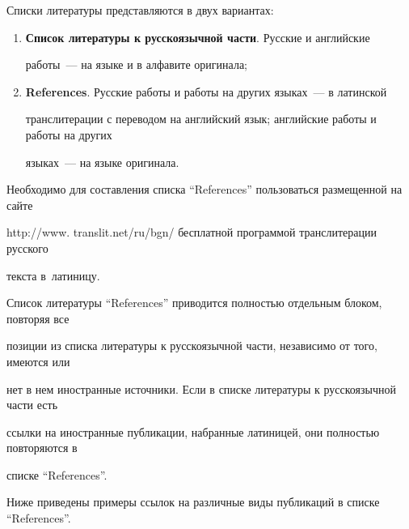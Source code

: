 {\begin{enumerate}[1.]
Списки литературы представляются в двух вариантах:\\[-14pt]





\noindent


\begin{enumerate}[(1)]


\item \textbf{Список литературы к русскоязычной части}. Русские и английские


работы~---  на языке и в алфавите оригинала;\\[-14.5pt]


\item  \textbf{References}. Русские работы и работы на других языках~--- в латинской


транслитерации с переводом на английский язык; английские работы и работы на других


языках~--- на языке оригинала.


\end{enumerate}





Необходимо для составления списка ``References'' пользоваться размещенной на сайте


{\sf http://www. translit.net/ru/bgn/} бесплатной программой транслитерации русского


 текста в~латиницу.





Список литературы ``References'' приводится полностью отдельным блоком, повторяя все


позиции из списка литературы к русскоязычной части, независимо от того, имеются или


нет в нем иностранные источники. Если в списке литературы к русскоязычной части есть


ссылки на иностранные публикации, набранные латиницей, они полностью повторяются в


списке ``References''.





Ниже приведены примеры ссылок на различные виды публикаций в списке ``References''.





\def\leftfootline{\ } %





\end{enumerate}}
